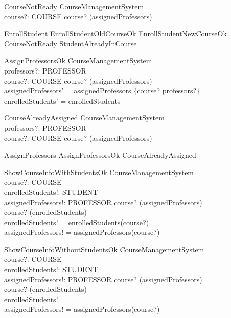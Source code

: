 \begin{schema}{CourseNotReady}
\Xi CourseManagementSystem \\
course?: COURSE
\where
    course? \notin \dom(assignedProfessors)
\end{schema}

\begin{zed}
    EnrollStudent  EnrollStudentOldCourseOk \lor EnrollStudentNewCourseOk \lor CourseNotReady \lor StudentAlreadyInCourse
\end{zed}

\begin{schema}{AssignProfessorsOk}
    \Delta CourseManagementSystem \\
    professors?: \power PROFESSOR \\
    course?: COURSE
    \where
    course? \notin \dom(assignedProfessors) \\
    assignedProfessors' = assignedProfessors \cup \{course? \mapsto professors?\} \\
    enrolledStudents' = enrolledStudents
\end{schema}

\begin{schema}{CourseAlreadyAssigned}
    \Xi CourseManagementSystem \\
    professors?: \power PROFESSOR \\
    course?: COURSE
    \where
    course? \in \dom(assignedProfessors)
\end{schema}

\begin{zed}
    AssignProfessors  AssignProfessorsOk \lor CourseAlreadyAssigned
\end{zed}

\begin{schema}{ShowCourseInfoWithStudentsOk}
    \Xi CourseManagementSystem \\
    course?: COURSE \\
    enrolledStudents!: \power STUDENT \\
    assignedProfessors!: \power PROFESSOR
    \where
    course? \in \dom(assignedProfessors) \\
    course? \in \dom(enrolledStudents) \\
    enrolledStudents! = enrolledStudents(course?) \\
    assignedProfessors! = assignedProfessors(course?)
\end{schema}

\begin{schema}{ShowCourseInfoWithoutStudentsOk}
    \Xi CourseManagementSystem \\
    course?: COURSE \\
    enrolledStudents!: \power STUDENT \\
    assignedProfessors!: \power PROFESSOR
    \where
    course? \in \dom(assignedProfessors) \\
    course? \notin \dom(enrolledStudents) \\
    enrolledStudents! = \emptyset \\
    assignedProfessors! = assignedProfessors(course?)
\end{schema}

